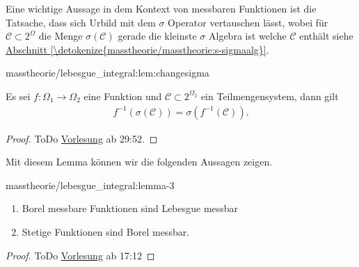 \documentclass[letterpaper,10pt,german]{jupyterBook}
\begin{document}
\par
Eine wichtige Aussage in dem Kontext von messbaren Funktionen ist die Tatsache, dass sich Urbild mit dem \(\sigma\) Operator vertauschen lässt, wobei für \(\mathcal{C}\subset 2^\Omega\) die Menge \(\sigma(\mathcal{C})\) gerade die kleinste \(\sigma\) Algebra ist welche \(\mathcal{C}\) enthält siehe \hyperref[\detokenize{masstheorie/masstheorie:s-sigmaalg}]{Abschnitt \ref{\detokenize{masstheorie/masstheorie:s-sigmaalg}}}.
\begin{lemma}{}{masstheorie/lebesgue_integral:lem:changesigma}



\par
Es sei \(f:\Omega_1\to\Omega_2\) eine Funktion und \(\mathcal{C}\subset 2^{\Omega_2}\) ein Teilmengensystem, dann gilt
\begin{align*}
f^{-1}(\sigma(\mathcal{C})) = \sigma(f^{-1}(\mathcal{C})).
\end{align*}\end{lemma}

\begin{proof}
 ToDo
\href{https://www.fau.tv/clip/id/40563}{Vorlesung} ab 29:52.
\end{proof}

\par
Mit diesem Lemma können wir die folgenden Aussagen zeigen.
\begin{lemma}{}{masstheorie/lebesgue_integral:lemma-3}


\begin{enumerate}

\item {} 
\par
Borel messbare Funktionen sind Lebesgue messbar

\item {} 
\par
Stetige Funktionen sind Borel messbar.

\end{enumerate}
\end{lemma}

\begin{proof}
 ToDo
\href{https://www.fau.tv/clip/id/40563}{Vorlesung} ab 17:12
\end{proof}
\end{document}
